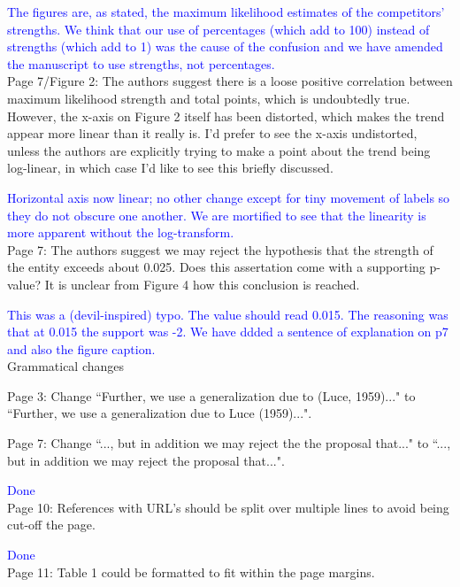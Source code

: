 \documentclass[12pt]{article}
\begin{document}
\textcolor{blue}{The figures are, as stated, the maximum likelihood
  estimates of the competitors' strengths.  We think that our use of
  percentages (which add to 100) instead of strengths (which add to 1)
  was the cause of the confusion and we have amended the manuscript to
  use strengths, not percentages.}\\

Page 7/Figure 2: The authors suggest there is a loose positive
correlation between maximum likelihood strength and total points,
which is undoubtedly true. However, the x-axis on Figure 2 itself has
been distorted, which makes the trend appear more linear than it
really is. I'd prefer to see the x-axis undistorted, unless the
authors are explicitly trying to make a point about the trend being
log-linear, in which case I'd like to see this briefly discussed.

\textcolor{blue}{Horizontal axis now linear; no other change except
  for tiny movement of labels so they do not obscure one another.  We
  are mortified to see that the linearity is more apparent without the
  log-transform.}\\

Page 7: The authors suggest we may reject the hypothesis that the
strength of the entity exceeds about 0.025. Does this assertation come
with a supporting p-value? It is unclear from Figure 4 how this
conclusion is reached.

\textcolor{blue}{This was a (devil-inspired) typo.  The value should
  read 0.015.  The reasoning was that at 0.015 the support was -2.  We
  have ddded a sentence of explanation on p7 and also the figure
  caption.}\\


Grammatical changes

Page 3: Change ``Further, we use a generalization due to (Luce,
1959)..." to ``Further, we use a generalization due to Luce
(1959)...".

Page 7: Change ``..., but in addition we may reject the
the proposal that..." to ``..., but in addition we may reject the
proposal that...".

\textcolor{blue}{Done}\\

Page 10: References with URL's should be split over multiple lines to avoid being cut-off the page.

\textcolor{blue}{Done}\\

Page 11: Table 1 could be formatted to fit within the page margins.
\end{document}
